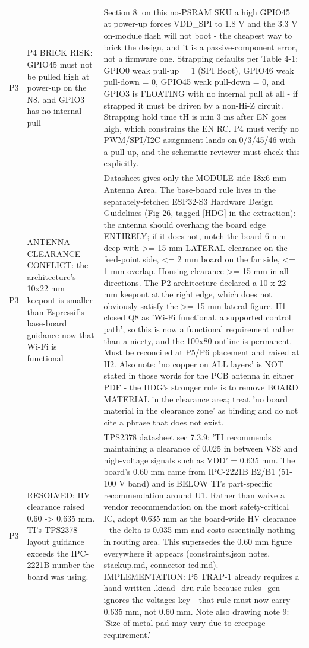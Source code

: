 \documentclass[11pt,a4paper]{article}
\begin{document}
{\begin{longtable}{lp{5.2cm}p{7.2cm}}
P3 & P4 BRICK RISK: GPIO45 must not be pulled high at power-up on the N8, and GPIO3 has no internal pull & Section 8: on this no-PSRAM SKU a high GPIO45 at power-up forces VDD\_SPI to 1.8 V and the 3.3 V on-module flash will not boot - the cheapest way to brick the design, and it is a passive-component error, not a firmware one. Strapping defaults per Table 4-1: GPIO0 weak pull-up = 1 (SPI Boot), GPIO46 weak pull-down = 0, GPIO45 weak pull-down = 0, and GPIO3 is FLOATING with no internal pull at all - if strapped it must be driven by a non-Hi-Z circuit. Strapping hold time tH is min 3 ms after EN goes high, which constrains the EN RC. P4 must verify no PWM/SPI/I2C assignment lands on 0/3/45/46 with a pull-up, and the schematic reviewer must check this explicitly. \\
P3 & ANTENNA CLEARANCE CONFLICT: the architecture's 10x22 mm keepout is smaller than Espressif's base-board guidance now that Wi-Fi is functional & Datasheet gives only the MODULE-side 18x6 mm Antenna Area. The base-board rule lives in the separately-fetched ESP32-S3 Hardware Design Guidelines (Fig 26, tagged {[}HDG{]} in the extraction): the antenna should overhang the board edge ENTIRELY; if it does not, notch the board 6 mm deep with \textgreater{}= 15 mm LATERAL clearance on the feed-point side, \textless{}= 2 mm board on the far side, \textless{}= 1 mm overlap. Housing clearance \textgreater{}= 15 mm in all directions. The P2 architecture declared a 10 x 22 mm keepout at the right edge, which does not obviously satisfy the \textgreater{}= 15 mm lateral figure. H1 closed Q8 as 'Wi-Fi functional, a supported control path', so this is now a functional requirement rather than a nicety, and the 100x80 outline is permanent. Must be reconciled at P5/P6 placement and raised at H2. Also note: 'no copper on ALL layers' is NOT stated in those words for the PCB antenna in either PDF - the HDG's stronger rule is to remove BOARD MATERIAL in the clearance area; treat 'no board material in the clearance zone' as binding and do not cite a phrase that does not exist. \\
P3 & RESOLVED: HV clearance raised 0.60 -\textgreater{} 0.635 mm. TI's TPS2378 layout guidance exceeds the IPC-2221B number the board was using. & TPS2378 datasheet sec 7.3.9: 'TI recommends maintaining a clearance of 0.025 in between VSS and high-voltage signals such as VDD' = 0.635 mm. The board's 0.60 mm came from IPC-2221B B2/B1 (51-100 V band) and is BELOW TI's part-specific recommendation around U1. Rather than waive a vendor recommendation on the most safety-critical IC, adopt 0.635 mm as the board-wide HV clearance - the delta is 0.035 mm and costs essentially nothing in routing area. This supersedes the 0.60 mm figure everywhere it appears (constraints.json notes, stackup.md, connector-icd.md). IMPLEMENTATION: P5 TRAP-1 already requires a hand-written .kicad\_dru rule because rules\_gen ignores the voltages key - that rule must now carry 0.635 mm, not 0.60 mm. Note also drawing note 9: 'Size of metal pad may vary due to creepage requirement.' \\

\end{longtable}}
\end{document}
